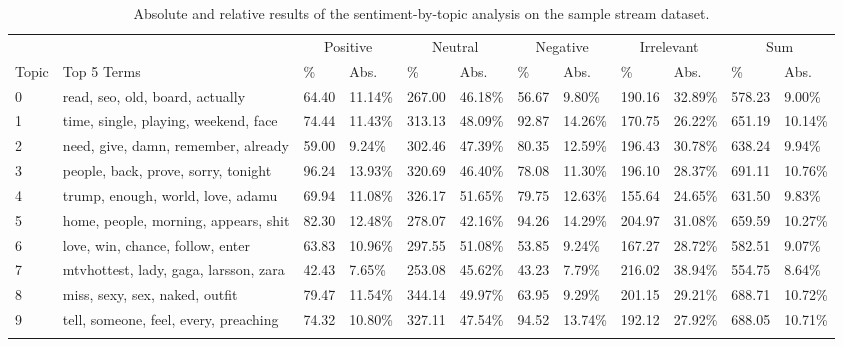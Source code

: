 \begin{table}
    \caption{Absolute and relative results of the sentiment-by-topic analysis on the sample stream dataset.}
    \label{tab:combination}
    \begin{tabular}{l l l l l l l l l l l l} %
        \toprule
        & &
        \multicolumn{2}{c}{Positive}&
        \multicolumn{2}{c}{Neutral}&
        \multicolumn{2}{c}{Negative}&
        \multicolumn{2}{c}{Irrelevant}&
        \multicolumn{2}{c}{Sum}
        \\\cmidrule{3-12}
        Topic & Top 5 Terms
        & \%
        & Abs.
        & \%
        & Abs.
        & \%
        & Abs.
        & \%
        & Abs.
        & \%
        & Abs.
        \\\midrule
        0 & read, seo, old, board, actually & 64.40 & 11.14\% & 267.00 & 46.18\% & 56.67 & 9.80\% & 190.16 & 32.89\% & 578.23 & 9.00\% \\\midrule
        1 & time, single, playing, weekend, face & 74.44 & 11.43\% & 313.13 & 48.09\% & 92.87 & 14.26\% & 170.75 & 26.22\% & 651.19 & 10.14\% \\\midrule
        2 & need, give, damn, remember, already & 59.00 & 9.24\% & 302.46 & 47.39\% & 80.35 & 12.59\% & 196.43 & 30.78\% & 638.24 & 9.94\% \\\midrule
        3 & people, back, prove, sorry, tonight & 96.24 & 13.93\% & 320.69 & 46.40\% & 78.08 & 11.30\% & 196.10 & 28.37\% & 691.11 & 10.76\% \\\midrule
        4 & trump, enough, world, love, adamu & 69.94 & 11.08\% & 326.17 & 51.65\% & 79.75 & 12.63\% & 155.64 & 24.65\% & 631.50 & 9.83\% \\\midrule
        5 & home, people, morning, appears, shit & 82.30 & 12.48\% & 278.07 & 42.16\% & 94.26 & 14.29\% & 204.97 & 31.08\% & 659.59 & 10.27\% \\\midrule
        6 & love, win, chance, follow, enter & 63.83 & 10.96\% & 297.55 & 51.08\% & 53.85 & 9.24\% & 167.27 & 28.72\% & 582.51 & 9.07\% \\\midrule
        7 & mtvhottest, lady, gaga, larsson, zara & 42.43 & 7.65\% & 253.08 & 45.62\% & 43.23 & 7.79\% & 216.02 & 38.94\% & 554.75 & 8.64\% \\\midrule
        8 & miss, sexy, sex, naked, outfit & 79.47 & 11.54\% & 344.14 & 49.97\% & 63.95 & 9.29\% & 201.15 & 29.21\% & 688.71 & 10.72\% \\\midrule
        9 & tell, someone, feel, every, preaching & 74.32 & 10.80\% & 327.11 & 47.54\% & 94.52 & 13.74\% & 192.12 & 27.92\% & 688.05 & 10.71\% \\\midrule
        \\\bottomrule
    \end{tabular}
\end{table}

